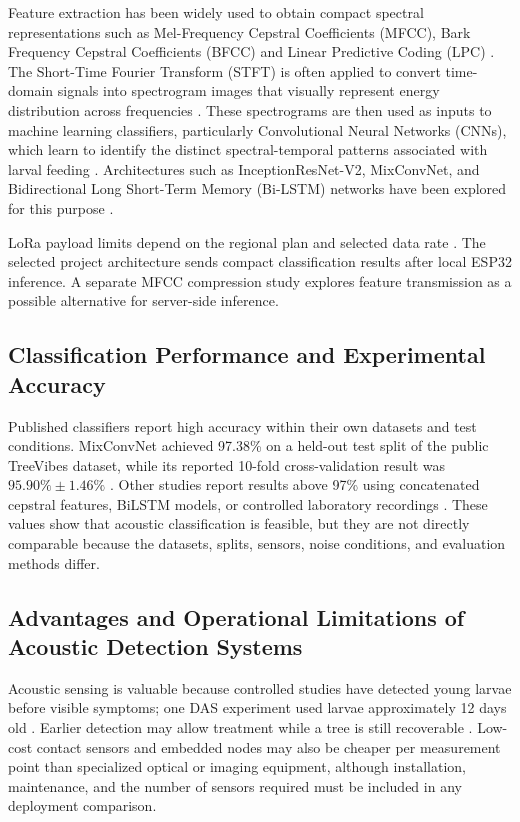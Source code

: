 \documentclass[12pt,a4paper,oneside]{memoir}
\newcommand{\earlierrevision}[1]{#1}
\newcommand{\newrevision}[1]{#1}
\begin{document}
\earlierrevision{Feature extraction has been widely used to obtain compact spectral representations such as Mel-Frequency Cepstral Coefficients (MFCC), Bark Frequency Cepstral Coefficients (BFCC) and Linear Predictive Coding (LPC) \cite{saleem2022,saranya2025}. The Short-Time Fourier Transform (STFT) is often applied to convert time-domain signals into spectrogram images that visually represent energy distribution across frequencies \cite{karar2022,saranya2025}. These spectrograms are then used as inputs to machine learning classifiers, particularly Convolutional Neural Networks (CNNs), which learn to identify the distinct spectral-temporal patterns associated with larval feeding \cite{karar2022,saranya2025}. Architectures such as InceptionResNet-V2, MixConvNet, and Bidirectional Long Short-Term Memory (Bi-LSTM) networks have been explored for this purpose \cite{karar2021,karar2022,saranya2025}.}

\newrevision{LoRa payload limits depend on the regional plan and selected data rate \cite{lorawan2023}. The selected project architecture sends compact classification results after local ESP32 inference. A separate MFCC compression study explores feature transmission as a possible alternative for server-side inference.}


\subsection{Classification Performance and Experimental Accuracy}

\earlierrevision{Published classifiers report high accuracy within their own datasets and test conditions. MixConvNet achieved 97.38\% on a held-out test split of the public TreeVibes dataset, while its reported 10-fold cross-validation result was $95.90\% \pm 1.46\%$ \cite{karar2022}. Other studies report results above 97\% using concatenated cepstral features, BiLSTM models, or controlled laboratory recordings \cite{boulila2023,saranya2025,pinhas2008}. These values show that acoustic classification is feasible, but they are not directly comparable because the datasets, splits, sensors, noise conditions, and evaluation methods differ.}

\subsection{Advantages and Operational Limitations of Acoustic Detection Systems}

Acoustic sensing is valuable because controlled studies have detected young larvae before visible symptoms; one DAS experiment used larvae approximately 12 days old \cite{ashry2020}. Earlier detection may allow treatment while a tree is still recoverable \cite{saleem2022}. Low-cost contact sensors and embedded nodes may also be cheaper per measurement point than specialized optical or imaging equipment, although installation, maintenance, and the number of sensors required must be included in any deployment comparison.
\end{document}
